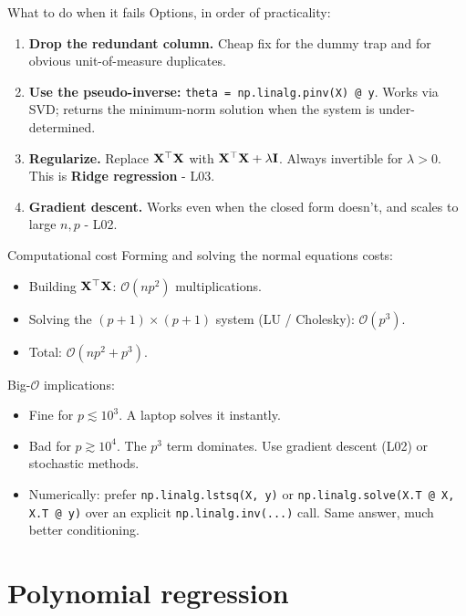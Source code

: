 \documentclass[aspectratio=169]{beamer}
\newcommand{\cX}{\Xmat}                  %
\begin{document}
\begin{frame}{What to do when it fails}
  Options, in order of practicality:
  \begin{enumerate}
    \item \textbf{Drop the redundant column.} Cheap fix for the dummy trap and for obvious unit-of-measure duplicates.
    \item \textbf{Use the pseudo-inverse:} \texttt{theta = np.linalg.pinv(X) @ y}. Works via SVD; returns the minimum-norm solution when the system is under-determined.
    \item \textbf{Regularize.} Replace $\cX^\top \cX$ with $\cX^\top \cX + \lambda \id$. Always invertible for $\lambda > 0$. This is \textbf{Ridge regression} - L03.
    \item \textbf{Gradient descent.} Works even when the closed form doesn't, and scales to large $n, p$ - L02.
  \end{enumerate}
\end{frame}

\begin{frame}{Computational cost}
  Forming and solving the normal equations costs:
  \begin{itemize}
    \item Building $\cX^\top \cX$: $\mathcal{O}(n p^2)$ multiplications.
    \item Solving the $(p+1) \times (p+1)$ system (LU / Cholesky): $\mathcal{O}(p^3)$.
    \item Total: $\mathcal{O}(n p^2 + p^3)$.
  \end{itemize}
  \vfill
  Big-$\mathcal{O}$ implications:
  \begin{itemize}
    \item Fine for $p \lesssim 10^3$. A laptop solves it instantly.
    \item Bad for $p \gtrsim 10^4$. The $p^3$ term dominates. Use gradient descent (L02) or stochastic methods.
    \item Numerically: prefer \texttt{np.linalg.lstsq(X, y)} or \texttt{np.linalg.solve(X.T @ X, X.T @ y)} over an explicit \texttt{np.linalg.inv(...)} call. Same answer, much better conditioning.
  \end{itemize}
\end{frame}

\section{Polynomial regression}
\end{document}
